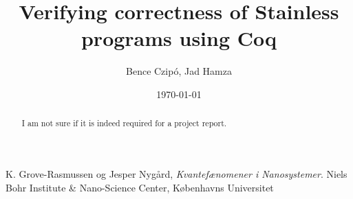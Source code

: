 \documentclass[a4paper]{article}
\title{Verifying correctness of Stainless programs using Coq}
\author{Bence Czipó, Jad Hamza}
\date{\today}
\begin{document}
\maketitle

\begin{abstract}
I am not sure if it is indeed required for a project report.
\end{abstract}










\begin{thebibliography}{9}
  K. Grove-Rasmussen og Jesper Nygård,
  \emph{Kvantefænomener i Nanosystemer}.
  Niels Bohr Institute \& Nano-Science Center, Københavns Universitet

\end{thebibliography}
\end{document}
